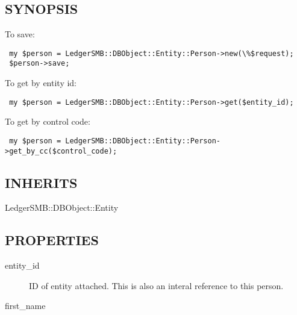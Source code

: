 \begin{description}
\begin{description}
\begin{description}
\begin{description}
\begin{description}
\begin{description}
\begin{description}
\begin{description}
\subsection*{SYNOPSIS\label{LedgerSMB::DBObject::Entity::Person_-_-_Natural_Person_handling_for_LedgerSMB_SYNOPSIS}}


To save:

\begin{verbatim}
 my $person = LedgerSMB::DBObject::Entity::Person->new(\%$request);
 $person->save;
\end{verbatim}


To get by entity id:

\begin{verbatim}
 my $person = LedgerSMB::DBObject::Entity::Person->get($entity_id);
\end{verbatim}


To get by control code:

\begin{verbatim}
 my $person = LedgerSMB::DBObject::Entity::Person->get_by_cc($control_code);
\end{verbatim}
\subsection*{INHERITS\label{LedgerSMB::DBObject::Entity::Person_-_-_Natural_Person_handling_for_LedgerSMB_INHERITS}}
\begin{description}

\item[{LedgerSMB::DBObject::Entity}] \mbox{}\end{description}
\subsection*{PROPERTIES\label{LedgerSMB::DBObject::Entity::Person_-_-_Natural_Person_handling_for_LedgerSMB_PROPERTIES}}
\begin{description}

\item[{entity\_id}] \mbox{}

ID of entity attached.  This is also an interal reference to this person.


\item[{first\_name}] \mbox{}


\end{description}
\end{description}
\end{description}
\end{description}
\end{description}
\end{description}
\end{description}
\end{description}
\end{description}
